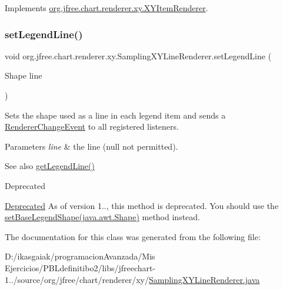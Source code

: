 Implements \mbox{\hyperlink{interfaceorg_1_1jfree_1_1chart_1_1renderer_1_1xy_1_1_x_y_item_renderer_ad3313de1104e462f8299b58ce9901cfb}{org.\+jfree.\+chart.\+renderer.\+xy.\+X\+Y\+Item\+Renderer}}.

\mbox{\label{classorg_1_1jfree_1_1chart_1_1renderer_1_1xy_1_1_sampling_x_y_line_renderer_a14fdb28396558b7d0c00cae5af9ea755}} 
\subsubsection{\texorpdfstring{set\+Legend\+Line()}{setLegendLine()}}
{\footnotesize\ttfamily void org.\+jfree.\+chart.\+renderer.\+xy.\+Sampling\+X\+Y\+Line\+Renderer.\+set\+Legend\+Line (\begin{DoxyParamCaption}\item[{Shape}]{line }\end{DoxyParamCaption})}

Sets the shape used as a line in each legend item and sends a \mbox{\hyperlink{}{Renderer\+Change\+Event}} to all registered listeners.


\begin{DoxyParams}{Parameters}
{\em line} & the line ({\ttfamily null} not permitted).\\
\hline
\end{DoxyParams}
\begin{DoxySeeAlso}{See also}
\mbox{\hyperlink{classorg_1_1jfree_1_1chart_1_1renderer_1_1xy_1_1_sampling_x_y_line_renderer_a10b79f154b6f60fa5b48ddfc64405e03}{get\+Legend\+Line()}}
\end{DoxySeeAlso}
\begin{DoxyRefDesc}{Deprecated}
\item[\mbox{\hyperlink{deprecated__deprecated000207}{Deprecated}}]As of version 1.., this method is deprecated. You should use the \mbox{\hyperlink{}{set\+Base\+Legend\+Shape(java.\+awt.\+Shape)}} method instead. \end{DoxyRefDesc}


The documentation for this class was generated from the following file\+:\begin{DoxyCompactItemize}
\item 
D\+:/ikasgaiak/programacion\+Avanzada/\+Mis Ejercicios/\+P\+B\+Ldefinitibo2/libs/jfreechart-\/1../source/org/jfree/chart/renderer/xy/\mbox{\hyperlink{_sampling_x_y_line_renderer_8java}{Sampling\+X\+Y\+Line\+Renderer.\+java}}\end{DoxyCompactItemize}
